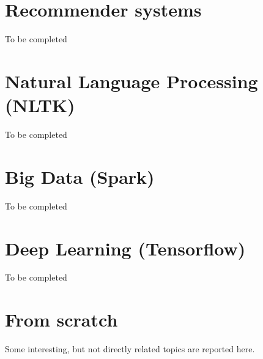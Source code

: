 \documentclass[11pt]{article}
\begin{document}
\section{Recommender systems}
To be completed


\section{Natural Language Processing (NLTK)}
To be completed

\section{Big Data (Spark)}
To be completed

\section{Deep Learning (Tensorflow)}
To be completed

\clearpage
\appendix
\section{From scratch}\label{sec:app1}
Some interesting, but not directly related topics are reported here.
\end{document}
